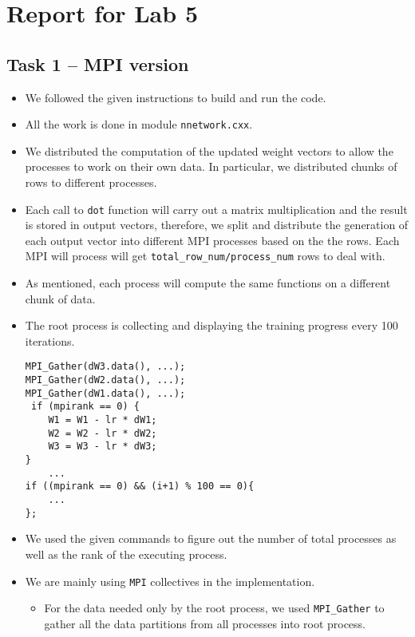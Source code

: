 \documentclass[a4paper, DIV12, headsepline]{scrartcl}
\begin{document}
\section*{Report for Lab 5}
\subsection*{Task 1 -- MPI version}
\begin{itemize}
\item We followed the given instructions to build and run the code.

\item All the work is  done in module \texttt{nnetwork.cxx}.

\item We distributed the computation of the updated weight vectors to allow the processes to work on their own data. In particular, we distributed chunks of rows to different processes.

\item Each call to  \texttt{dot} function will carry out a matrix multiplication and the result is stored in output vectors,
therefore, we split and distribute the generation of each output vector into different MPI processes based on the the rows. Each MPI will process will get \texttt{total\_row\_num/process\_num} rows to deal with.

\item As mentioned, each process will compute the same functions on a different chunk of data.

\item The root process is collecting and displaying the training progress every 100 iterations.
\begin{verbatim}
MPI_Gather(dW3.data(), ...);
MPI_Gather(dW2.data(), ...);
MPI_Gather(dW1.data(), ...);
 if (mpirank == 0) {
    W1 = W1 - lr * dW1;
    W2 = W2 - lr * dW2;
    W3 = W3 - lr * dW3;
}
    ...
if ((mpirank == 0) && (i+1) % 100 == 0){
    ...
};
\end{verbatim}

\item We used the given commands to figure out the number of total processes as well as the rank of the executing process.

\item We are mainly using  \texttt{MPI} collectives in the implementation.
\begin{itemize}
\item For the data needed only by the root process, we used  \texttt{MPI\_Gather} to gather all the data partitions from all processes into root process.


\end{itemize}
\end{itemize}
\end{document}
